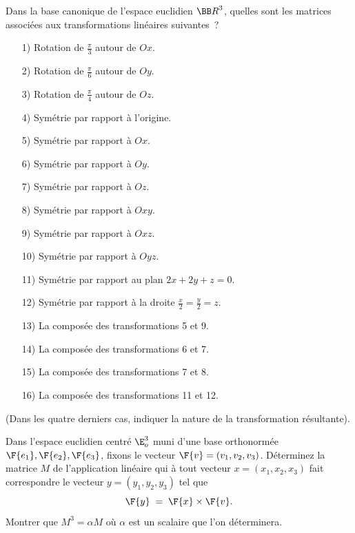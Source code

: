 \documentclass[12pt,french,oneside,a4paper]{memoir} %
\begin{document}
\begin{exo}
Dans la base canonique de l'espace euclidien ${\BB R}^3$, quelles sont les 
matrices associées aux transformations linéaires suivantes~?
\begin{enumerate}
\item[ 1)] Rotation de $\frac{\pi}{3}$ autour de $Ox$.
\item[ 2)] Rotation de $\frac{\pi}{6}$ autour de $Oy$.
\item[ 3)] Rotation de $\frac{\pi}{4}$ autour de $Oz$.
\item[ 4)] Symétrie par rapport à l'origine.
\item[ 5)] Symétrie par rapport à $Ox$.
\item[ 6)] Symétrie par rapport à $Oy$.
\item[ 7)] Symétrie par rapport à $Oz$.
\item[ 8)] Symétrie par rapport à $Oxy$.
\item[ 9)] Symétrie par rapport à $Oxz$.
\item[10)] Symétrie par rapport à $Oyz$.
\item[11)] Symétrie par rapport au plan $2x+2y+z=0$.
\item[12)] Symétrie par rapport à la droite $\displaystyle{\frac{x}{2}=\frac{y}{2}=z}$.
\item[13)] La composée des transformations 5 et 9.
\item[14)] La composée des transformations 6 et 7.
\item[15)] La composée des transformations 7 et 8.
\item[16)] La composée des transformations 11 et 12.
\end{enumerate}
(Dans les quatre derniers cas, indiquer la nature de la transformation résultante).
\end{exo}
\begin{exo}
Dans l'espace euclidien centré ${\E}_o^3$ muni d'une base orthonormée $\F{e_1}, \F{e_2}, \F{e_3}$, fixons le vecteur 
$\F{v}=(v_1,v_2,v_3)$.  Déterminez la matrice $M$ de l'application linéaire qui à tout vecteur $x=(x_1,x_2,x_3)$ fait correspondre le vecteur $y=(y_1,y_2,y_3)$ tel que 
\begin{equation*}
\F{y} \;=\; \F{x} \times \F{v}.
\end{equation*}
Montrer que $M^3= \alpha M$ où $\alpha$ est un scalaire que l'on déterminera.
\end{exo}
\end{document}
